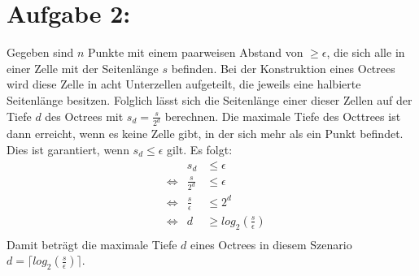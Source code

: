 \section*{Aufgabe 2: }
Gegeben sind $n$ Punkte mit einem paarweisen Abstand von $\geq \epsilon$, die sich alle in einer Zelle mit der Seitenlänge $s$ befinden. Bei der Konstruktion eines Octrees wird diese Zelle in acht Unterzellen aufgeteilt, die jeweils eine halbierte Seitenlänge besitzen. Folglich lässt sich die Seitenlänge einer dieser Zellen auf der Tiefe $d$ des Octrees mit $s_d = \frac{s}{2^d}$ berechnen. Die maximale Tiefe des Octtrees ist dann erreicht, wenn es keine Zelle gibt, in der sich mehr als ein Punkt befindet. Dies ist garantiert, wenn $s_d \leq \epsilon$ gilt. Es folgt:
\begin{align*}
  && s_d & \leq \epsilon\\
  &\Leftrightarrow & \frac{s}{2^d} & \leq \epsilon\\
  &\Leftrightarrow & \frac{s}{\epsilon} & \leq 2^d\\
  &\Leftrightarrow & d & \geq log_2(\frac{s}{\epsilon})\\
\end{align*}
Damit beträgt die maximale Tiefe $d$ eines Octrees in diesem Szenario $d = \lceil log_2(\frac{s}{\epsilon}) \rceil$.